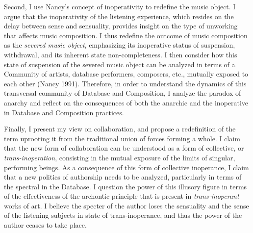 Second, I use Nancy's concept of inoperativity to redefine the music object. I argue that the inoperativity of the listening experience, which resides on the delay between sense and sensuality, provides insight on the type of unworking that affects music composition. I thus redefine the outcome of music composition as the \textit{severed music object}, emphasizing its inoperative status of suspension, withdrawal, and its inherent state non-completeness. I then consider how this state of suspension of the severed music object can be analyzed in terms of a Community of artists, database performers, composers, etc., mutually exposed to each other (Nancy 1991). Therefore, in order to understand the dynamics of this transversal community of Database and Composition, I analyze the paradox of anarchy and reflect on the consequences of both the anarchic and the inoperative in Database and Composition practices. 

Finally, I present my view on collaboration, and propose a redefinition of the term uprooting it from the traditional union of forces forming a whole. I claim that the new form of collaboration can be understood as a form of collective, or \textit{trans-inoperation}, consisting in the mutual exposure of the limits of singular, performing beings. As a consequence of this form of collective inoperance, I claim that a new politics of authorship needs to be analyzed, particularly in terms of the spectral in the Database. I question the power of this illusory figure in terms of the effectiveness of the archontic principle that is present in \textit{trans-inoperant} works of art. I believe the specter of the author loses the sensuality and the sense of the listening subjects in state of trans-inoperance, and thus the power of the author ceases to take place.




